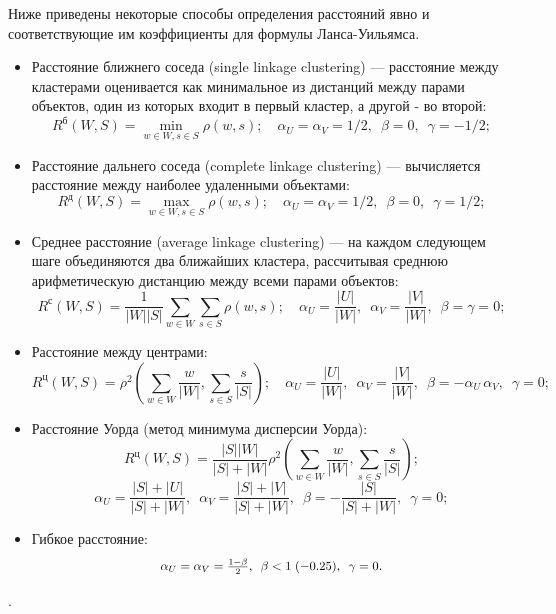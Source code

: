 \documentclass[10pt]{article}
\begin{document}
Ниже приведены некоторые способы определения расстояний явно и соответствующие им коэффициенты для формулы Ланса-Уильямса. 
\begin{itemize}
	\item Расстояние ближнего соседа (single linkage clustering) --- расстояние между кластерами оценивается как минимальное из дистанций между парами объектов, один из которых входит в первый кластер, а другой - во второй:
	$$R^{\text{б}}(W, S) = \min_{w \in W, s \in S} \rho(w, s); \quad \alpha_U=\alpha_V=1/2,\enspace \beta=0,\enspace \gamma=-1/2;$$
	\item Расстояние дальнего соседа (complete linkage clustering) --- вычисляется расстояние между наиболее удаленными объектами:
	$$R^{\text{д}}(W, S) = \max_{w \in W, s \in S} \rho(w, s); \quad \alpha_U=\alpha_V=1/2,\enspace \beta=0,\enspace \gamma=1/2;$$
	\item Среднее расстояние (average linkage clustering) --- на каждом следующем шаге объединяются два ближайших кластера, рассчитывая среднюю арифметическую дистанцию между всеми парами объектов:
	$$R^{\text{с}}(W, S) = \frac{1}{ |W| |S| } \sum_{w \in W} \sum_{s \in S} \rho(w, s); \quad \alpha_U=\frac{|U|}{|W|},\enspace \alpha_V=\frac{|V|}{|W|},\enspace \beta=\gamma=0;$$
	
	\item Расстояние между центрами:
	$$R^{\text{ц}}(W, S) = \rho^2 \left( \sum_{w \in W} \frac{w}{|W|}, \sum_{s \in S} \frac{s}{|S|}\right); \quad
	\alpha_U=\frac{|U|}{|W|},\enspace \alpha_V=\frac{|V|}{|W|},\enspace \beta= -\alpha_U \,\alpha_V,\enspace \gamma=0;$$
	\item Расстояние Уорда (метод минимума дисперсии Уорда):
	$$R^{\text{ц}}(W, S) = \frac{|S| |W|}{|S| + |W|} \rho^2 \left( \sum_{w \in W} \frac{w}{|W|}, \sum_{s \in S} \frac{s}{|S|}\right);$$  
	$$\alpha_U=\frac{|S|+|U|}{|S|+|W|},\enspace \alpha_V=\frac{|S|+|V|}{|S|+|W|},\enspace \beta= -\frac{|S|}{|S|+|W|},\enspace \gamma=0;$$
	
	\item Гибкое расстояние: $$\scalebox{0.9}{$\alpha_U=\alpha_V=\frac{1-\beta}{2},\enspace \beta<1 \;(-0.25),\enspace \gamma=0$}.$$
\end{itemize}.
\end{document}
